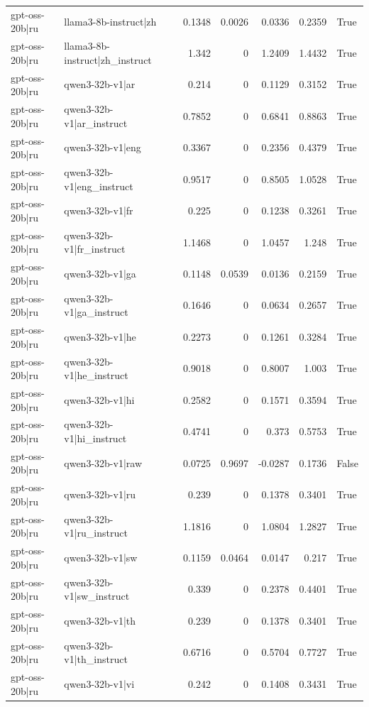 \begin{table}
\begin{tabular}{l l r r r r l}
gpt-oss-20b|ru & llama3-8b-instruct|zh & 0.1348 & 0.0026 & 0.0336 & 0.2359 & True \\
gpt-oss-20b|ru & llama3-8b-instruct|zh_instruct & 1.342 & 0 & 1.2409 & 1.4432 & True \\
gpt-oss-20b|ru & qwen3-32b-v1|ar & 0.214 & 0 & 0.1129 & 0.3152 & True \\
gpt-oss-20b|ru & qwen3-32b-v1|ar_instruct & 0.7852 & 0 & 0.6841 & 0.8863 & True \\
gpt-oss-20b|ru & qwen3-32b-v1|eng & 0.3367 & 0 & 0.2356 & 0.4379 & True \\
gpt-oss-20b|ru & qwen3-32b-v1|eng_instruct & 0.9517 & 0 & 0.8505 & 1.0528 & True \\
gpt-oss-20b|ru & qwen3-32b-v1|fr & 0.225 & 0 & 0.1238 & 0.3261 & True \\
gpt-oss-20b|ru & qwen3-32b-v1|fr_instruct & 1.1468 & 0 & 1.0457 & 1.248 & True \\
gpt-oss-20b|ru & qwen3-32b-v1|ga & 0.1148 & 0.0539 & 0.0136 & 0.2159 & True \\
gpt-oss-20b|ru & qwen3-32b-v1|ga_instruct & 0.1646 & 0 & 0.0634 & 0.2657 & True \\
gpt-oss-20b|ru & qwen3-32b-v1|he & 0.2273 & 0 & 0.1261 & 0.3284 & True \\
gpt-oss-20b|ru & qwen3-32b-v1|he_instruct & 0.9018 & 0 & 0.8007 & 1.003 & True \\
gpt-oss-20b|ru & qwen3-32b-v1|hi & 0.2582 & 0 & 0.1571 & 0.3594 & True \\
gpt-oss-20b|ru & qwen3-32b-v1|hi_instruct & 0.4741 & 0 & 0.373 & 0.5753 & True \\
gpt-oss-20b|ru & qwen3-32b-v1|raw & 0.0725 & 0.9697 & -0.0287 & 0.1736 & False \\
gpt-oss-20b|ru & qwen3-32b-v1|ru & 0.239 & 0 & 0.1378 & 0.3401 & True \\
gpt-oss-20b|ru & qwen3-32b-v1|ru_instruct & 1.1816 & 0 & 1.0804 & 1.2827 & True \\
gpt-oss-20b|ru & qwen3-32b-v1|sw & 0.1159 & 0.0464 & 0.0147 & 0.217 & True \\
gpt-oss-20b|ru & qwen3-32b-v1|sw_instruct & 0.339 & 0 & 0.2378 & 0.4401 & True \\
gpt-oss-20b|ru & qwen3-32b-v1|th & 0.239 & 0 & 0.1378 & 0.3401 & True \\
gpt-oss-20b|ru & qwen3-32b-v1|th_instruct & 0.6716 & 0 & 0.5704 & 0.7727 & True \\
gpt-oss-20b|ru & qwen3-32b-v1|vi & 0.242 & 0 & 0.1408 & 0.3431 & True \\

\end{tabular}
\end{table}
